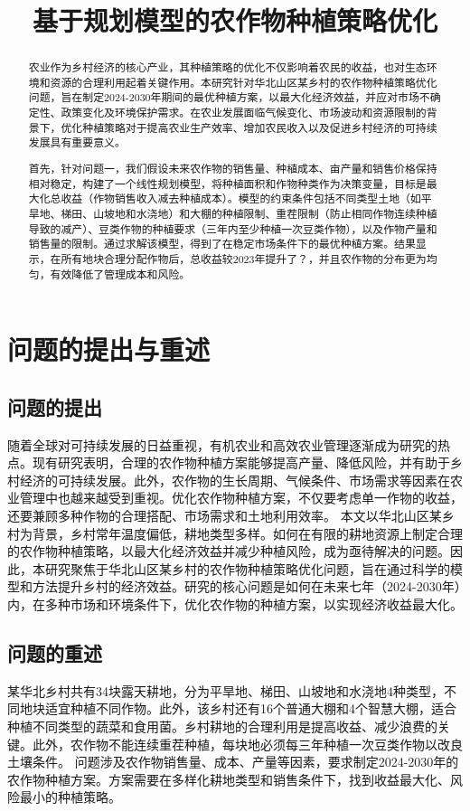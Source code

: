 \documentclass{cumcmthesis}
\title{基于规划模型的农作物种植策略优化}
\begin{document}
\maketitle

\begin{abstract}
农业作为乡村经济的核心产业，其种植策略的优化不仅影响着农民的收益，也对生态环境和资源的合理利用起着关键作用。本研究针对华北山区某乡村的农作物种植策略优化问题，旨在制定2024-2030年期间的最优种植方案，以最大化经济效益，并应对市场不确定性、政策变化及环境保护需求。在农业发展面临气候变化、市场波动和资源限制的背景下，优化种植策略对于提高农业生产效率、增加农民收入以及促进乡村经济的可持续发展具有重要意义。

首先，针对问题一，我们假设未来农作物的销售量、种植成本、亩产量和销售价格保持相对稳定，构建了一个线性规划模型，将种植面积和作物种类作为决策变量，目标是最大化总收益（作物销售收入减去种植成本）。模型的约束条件包括不同类型土地（如平旱地、梯田、山坡地和水浇地）和大棚的种植限制、重茬限制（防止相同作物连续种植导致的减产）、豆类作物的种植要求（三年内至少种植一次豆类作物），以及作物产量和销售量的限制。通过求解该模型，得到了在稳定市场条件下的最优种植方案。结果显示，在所有地块合理分配作物后，总收益较2023年提升了？，并且农作物的分布更为均匀，有效降低了管理成本和风险。

\end{abstract}

\section{问题的提出与重述}
\subsection{问题的提出}
随着全球对可持续发展的日益重视，有机农业和高效农业管理逐渐成为研究的热点。现有研究表明，合理的农作物种植方案能够提高产量、降低风险，并有助于乡村经济的可持续发展\cite{ref1}。此外，农作物的生长周期、气候条件、市场需求等因素在农业管理中也越来越受到重视。优化农作物种植方案，不仅要考虑单一作物的收益，还要兼顾多种作物的合理搭配、市场需求和土地利用效率。
本文以华北山区某乡村为背景，乡村常年温度偏低，耕地类型多样。如何在有限的耕地资源上制定合理的农作物种植策略，以最大化经济效益并减少种植风险，成为亟待解决的问题。因此，本研究聚焦于华北山区某乡村的农作物种植策略优化问题，旨在通过科学的模型和方法提升乡村的经济效益。研究的核心问题是如何在未来七年（2024-2030年）内，在多种市场和环境条件下，优化农作物的种植方案，以实现经济收益最大化。
\subsection{问题的重述}
某华北乡村共有34块露天耕地，分为平旱地、梯田、山坡地和水浇地4种类型，不同地块适宜种植不同作物。此外，该乡村还有16个普通大棚和4个智慧大棚，适合种植不同类型的蔬菜和食用菌。乡村耕地的合理利用是提高收益、减少浪费的关键。此外，农作物不能连续重茬种植，每块地必须每三年种植一次豆类作物以改良土壤条件。
问题涉及农作物销售量、成本、产量等因素，要求制定2024-2030年的农作物种植方案。方案需要在多样化耕地类型和销售条件下，找到收益最大化、风险最小的种植策略。
\end{document}
